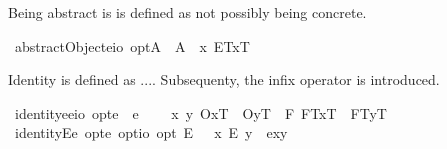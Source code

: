 \begin{isabellebody}
\begin{isamarkuptext}%
Being abstract is is defined as not possibly being concrete.%
\end{isamarkuptext}%
\isamarkuptrue%
\isamarkupfalse%
\ abstractObject{\isacharcolon}{\isacharcolon}{\isachardoublequoteopen}{\isacharparenleft}e{\isasymRightarrow}io{\isacharparenright}\ opt{\isachardoublequoteclose}{\isacharparenleft}{\isachardoublequoteopen}A{\isacharbang}{\isachardoublequoteclose}{\isacharparenright}\ \ {\isachardoublequoteopen}A{\isacharbang}\ {\isasymequiv}\ \isactrlbold {\isasymlambda}x{\isachardot}\ \isactrlbold {\isasymnot}{\isacharparenleft}\isactrlbold {\isasymdiamond}{\isasymlparr}E\isactrlsup T{\isacharcomma}x\isactrlsup T{\isasymrparr}{\isacharparenright}{\isachardoublequoteclose}%
\begin{isamarkuptext}%
Identity  is defined as .... Subsequenty, the infix operator  is 
 introduced.%
\end{isamarkuptext}%
\isamarkuptrue%
\isamarkupfalse%
\ identity{\isacharcolon}{\isacharcolon}{\isachardoublequoteopen}{\isacharparenleft}e{\isasymRightarrow}e{\isasymRightarrow}io{\isacharparenright}\ opt{\isachardoublequoteclose}{\isacharparenleft}{\isachardoublequoteopen}\isactrlbold {\isacharequal}\isactrlsub e{\isachardoublequoteclose}{\isacharparenright}\ \ {\isachardoublequoteopen}\isactrlbold {\isacharequal}\isactrlsub e\ {\isasymequiv}\ \isanewline
\ \ \isactrlbold {\isasymlambda}x\ y{\isachardot}\ {\isacharparenleft}{\isasymlparr}O{\isacharbang}{\isacharcomma}x\isactrlsup T{\isasymrparr}\ \isactrlbold {\isasymand}\ {\isasymlparr}O{\isacharbang}{\isacharcomma}y\isactrlsup T{\isasymrparr}{\isacharparenright}\ \isactrlbold {\isasymand}\ \isactrlbold {\isasymbox}{\isacharparenleft}\isactrlbold {\isasymforall}{\isacharparenleft}{\isasymlambda}F{\isachardot}\ {\isasymlparr}F\isactrlsup T{\isacharcomma}x\isactrlsup T{\isasymrparr}\ \isactrlbold {\isasymequiv}\ {\isasymlparr}F\isactrlsup T{\isacharcomma}y\isactrlsup T{\isasymrparr}{\isacharparenright}{\isacharparenright}{\isacharparenright}{\isachardoublequoteclose}\isanewline
\isanewline
{}\isamarkupfalse%
\ identityE{\isacharcolon}{\isacharcolon}{\isachardoublequoteopen}e\ opt{\isasymRightarrow}e\ opt{\isasymRightarrow}io\ opt{\isachardoublequoteclose}{\isacharparenleft}\ {\isachardoublequoteopen}\isactrlbold {\isacharequal}\isactrlsub E{\isachardoublequoteclose}\ {}{}{\isacharparenright}\ \ {\isachardoublequoteopen}x\ \isactrlbold {\isacharequal}\isactrlsub E\ y\ {\isasymequiv}\ {\isasymlparr}\isactrlbold {\isacharequal}\isactrlsub e{\isacharcomma}x{\isacharcomma}y{\isasymrparr}{\isachardoublequoteclose}%

\end{isabellebody}
